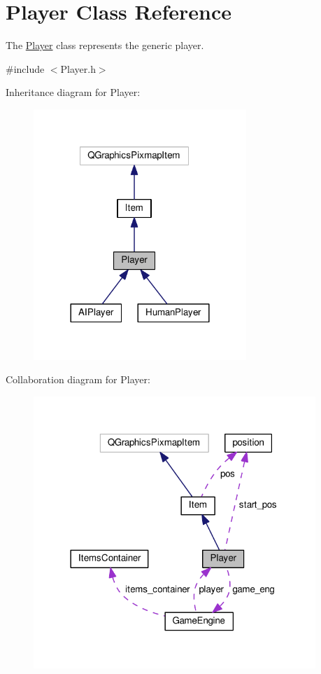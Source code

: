 \hypertarget{class_player}{}\section{Player Class Reference}
\label{class_player}


The \hyperlink{class_player}{Player} class represents the generic player.  




{\ttfamily \#include $<$Player.\+h$>$}



Inheritance diagram for Player\+:\nopagebreak
\begin{figure}[H]
\begin{center}
\leavevmode
\includegraphics[width=228pt]{class_player__inherit__graph}
\end{center}
\end{figure}


Collaboration diagram for Player\+:\nopagebreak
\begin{figure}[H]
\begin{center}
\leavevmode
\includegraphics[width=302pt]{class_player__coll__graph}
\end{center}
\end{figure}
